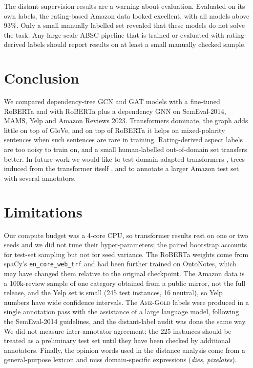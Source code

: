 \documentclass[11pt]{article}
\newcommand{\gold}{\textsc{Amz-Gold}}
\begin{document}
The distant supervision results are a warning about evaluation. Evaluated on its own labels, the rating-based Amazon data looked excellent, with all models above 93\%. Only a small manually labelled set revealed that these models do not solve the task. Any large-scale ABSC pipeline that is trained or evaluated with rating-derived labels should report results on at least a small manually checked sample.

\section{Conclusion}

We compared dependency-tree GCN and GAT models with a fine-tuned RoBERTa and with RoBERTa plus a dependency GNN on SemEval-2014, MAMS, Yelp and Amazon Reviews 2023. Transformers dominate, the graph adds little on top of GloVe, and on top of RoBERTa it helps on mixed-polarity sentences when such sentences are rare in training. Rating-derived aspect labels are too noisy to train on, and a small human-labelled out-of-domain set transfers better. In future work we would like to test domain-adapted transformers \citep{xu-etal-2019-bert}, trees induced from the transformer itself \citep{dai-etal-2021-syntax}, and to annotate a larger Amazon test set with several annotators.

\section*{Limitations}

Our compute budget was a 4-core CPU, so transformer results rest on one or two seeds and we did not tune their hyper-parameters; the paired bootstrap accounts for test-set sampling but not for seed variance. The RoBERTa weights come from spaCy's \texttt{en\_core\_web\_trf} and had been further trained on OntoNotes, which may have changed them relative to the original checkpoint. The Amazon data is a 100k-review sample of one category obtained from a public mirror, not the full release, and the Yelp set is small (245 test instances, 16 neutral), so Yelp numbers have wide confidence intervals. The \gold{} labels were produced in a single annotation pass with the assistance of a large language model, following the SemEval-2014 guidelines, and the distant-label audit was done the same way. We did not measure inter-annotator agreement; the 225 instances should be treated as a preliminary test set until they have been checked by additional annotators. Finally, the opinion words used in the distance analysis come from a general-purpose lexicon and miss domain-specific expressions (\textit{dies}, \textit{pixelates}).
\end{document}
